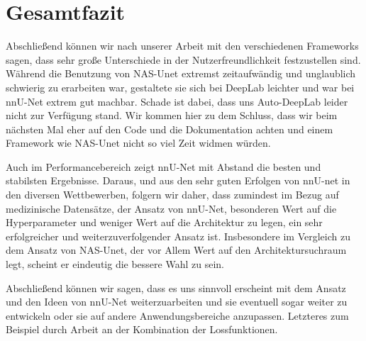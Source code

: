 \chapter{Gesamtfazit}
\label{ch:conclusion}



Abschließend können wir nach unserer Arbeit mit den verschiedenen Frameworks sagen, dass sehr große Unterschiede in der Nutzerfreundlichkeit festzustellen sind. Während die Benutzung von NAS-Unet extremst zeitaufwändig und unglaublich schwierig zu erarbeiten war, gestaltete sie sich bei DeepLab leichter und war bei nnU-Net extrem gut machbar. Schade ist dabei, dass uns Auto-DeepLab leider nicht zur Verfügung stand. 
Wir kommen hier zu dem Schluss, dass wir beim nächsten Mal eher auf den Code und die Dokumentation achten und einem Framework wie NAS-Unet nicht so viel Zeit widmen würden. 

Auch im Performancebereich zeigt nnU-Net mit Abstand die besten und stabilsten Ergebnisse. Daraus, und aus den sehr guten Erfolgen von nnU-net in den diversen Wettbewerben, folgern wir daher, dass zumindest im Bezug auf medizinische Datensätze, der Ansatz von nnU-Net, besonderen Wert auf die Hyperparameter und weniger Wert auf die Architektur zu legen, ein sehr erfolgreicher und weiterzuverfolgender Ansatz ist. Insbesondere im Vergleich zu dem Ansatz von NAS-Unet, der vor Allem Wert auf den Architektursuchraum legt, scheint er eindeutig die bessere Wahl zu sein. 

Abschließend können wir sagen, dass es uns sinnvoll erscheint mit dem Ansatz und den Ideen von nnU-Net weiterzuarbeiten und sie eventuell sogar weiter zu entwickeln oder sie auf andere Anwendungsbereiche anzupassen. Letzteres zum Beispiel durch Arbeit an der Kombination der Lossfunktionen.





